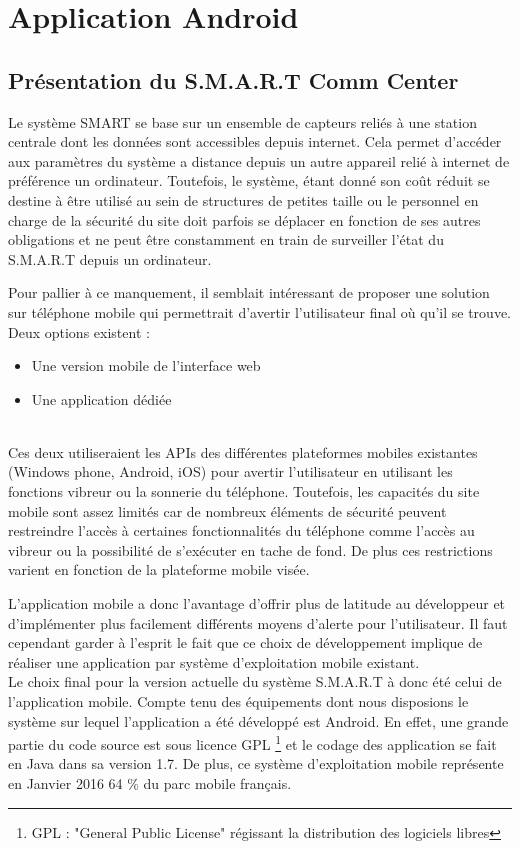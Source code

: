 



\chapter{Application Android}

\section{Présentation du S.M.A.R.T Comm Center}

	Le système SMART se base sur un ensemble de capteurs reliés à une station centrale dont les données sont accessibles depuis internet. Cela permet d'accéder aux paramètres du système a distance depuis un autre appareil relié à internet de préférence un ordinateur. Toutefois, le système, étant donné son coût réduit se destine à être utilisé au sein de structures de petites taille ou le personnel en charge de la sécurité du site doit parfois se déplacer en fonction de ses autres obligations et ne peut être constamment en train de surveiller l'état du S.M.A.R.T depuis un ordinateur. 
	
	Pour pallier à ce manquement, il semblait intéressant de proposer une solution sur téléphone mobile qui permettrait d'avertir l'utilisateur final où qu'il se trouve. Deux options existent :
	~\\
	\begin{itemize}
	
	\item Une version mobile de l'interface web
	\item Une application dédiée	
		
	\end{itemize}
	~\\
	 Ces deux utiliseraient les APIs des différentes plateformes mobiles existantes (Windows phone, Android, iOS) pour avertir l'utilisateur en utilisant les fonctions vibreur ou la sonnerie du téléphone.
	 Toutefois, les capacités du site mobile sont assez limités car de nombreux éléments de sécurité peuvent restreindre l'accès à certaines fonctionnalités du téléphone comme l'accès au vibreur ou la possibilité de s'exécuter en tache de fond. De plus ces restrictions varient en fonction de la plateforme mobile visée.
	
	 L'application mobile a donc l'avantage d'offrir plus de latitude au développeur et d'implémenter plus facilement différents moyens d'alerte pour l'utilisateur. Il faut cependant garder à l'esprit le fait que ce choix de développement implique de réaliser une application par système d'exploitation mobile existant.
	~\\
	Le choix final pour la version actuelle du système S.M.A.R.T à donc été celui de l'application mobile. Compte tenu des équipements dont nous disposions le système sur lequel l'application a été développé est Android. En effet, une grande partie du code source est sous licence GPL \footnote{GPL : "General Public License" régissant la distribution des logiciels libres} et le codage des application se fait en Java dans sa version 1.7. De plus, ce système d'exploitation mobile représente en Janvier 2016 64 \% du parc mobile français.

